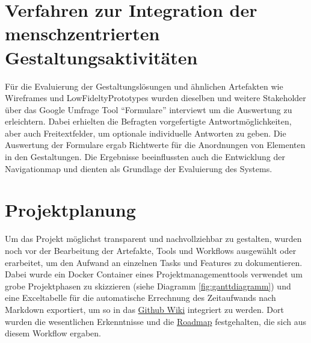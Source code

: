\section{Verfahren zur Integration der menschzentrierten Gestaltungsaktivitäten}     
Für die Evaluierung der Gestaltungslösungen und ähnlichen Artefakten wie Wireframes und LowFideltyPrototypes wurden dieselben und weitere Stakeholder über das Google Umfrage Tool {``Formulare''} interviewt um die Auswertung zu erleichtern. Dabei erhielten die Befragten vorgefertigte Antwortmöglichkeiten, aber auch Freitextfelder, um optionale individuelle Antworten zu geben. Die Auswertung der Formulare ergab Richtwerte für die Anordnungen von Elementen in den Gestaltungen. Die Ergebnisse beeinflussten auch die Entwicklung der Navigationmap und dienten als Grundlage der Evaluierung des Systems.

\section{Projektplanung}
Um das Projekt möglichst transparent und nachvollziehbar zu gestalten, wurden noch vor der Bearbeitung der Artefakte, Tools und Workflows ausgewählt oder erarbeitet, um den Aufwand an einzelnen Tasks und Features zu dokumentieren. Dabei wurde ein Docker Container eines Projektmanagementtools verwendet um grobe Projektphasen zu skizzieren (siehe Diagramm \ref{fig:ganttdiagramm}) und eine Exceltabelle für die automatische Errechnung des Zeitaufwands nach Markdown exportiert, um so in das \href{https://github.com/Inf166/design-concept-sharing-recipes/wiki}{Github Wiki} integriert zu werden. Dort wurden die wesentlichen Erkenntnisse und die \href{https://github.com/Inf166/design-concept-sharing-recipes/wiki/Roadmap}{Roadmap} festgehalten, die sich aus diesem Workflow ergaben.\\

